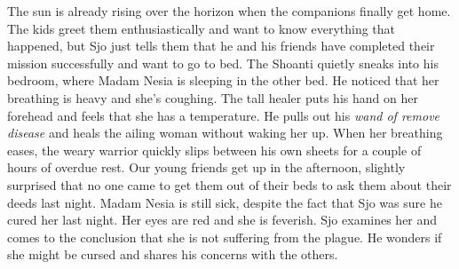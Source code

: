 The sun is already rising over the horizon when the companions finally get home. The kids greet them enthusiastically and want to know everything that happened, but Sjo just tells them that he and his friends have completed their mission successfully and want to go to bed. The Shoanti quietly sneaks into his bedroom, where Madam Nesia is sleeping in the other bed. He noticed that her breathing is heavy and she's coughing. The tall healer puts his hand on her forehead and feels that she has a temperature. He pulls out his {\itshape wand of remove disease} and heals the ailing woman without waking her up. When her breathing eases, the weary warrior quickly slips between his own sheets for a couple of hours of overdue rest. Our young friends get up in the afternoon, slightly surprised that no one came to get them out of their beds to ask them about their deeds last night. Madam Nesia is still sick, despite the fact that Sjo was sure he cured her last night. Her eyes are red and she is feverish. Sjo examines her and comes to the conclusion that she is not suffering from the plague. He wonders if she might be cursed and shares his concerns with the others.\\

